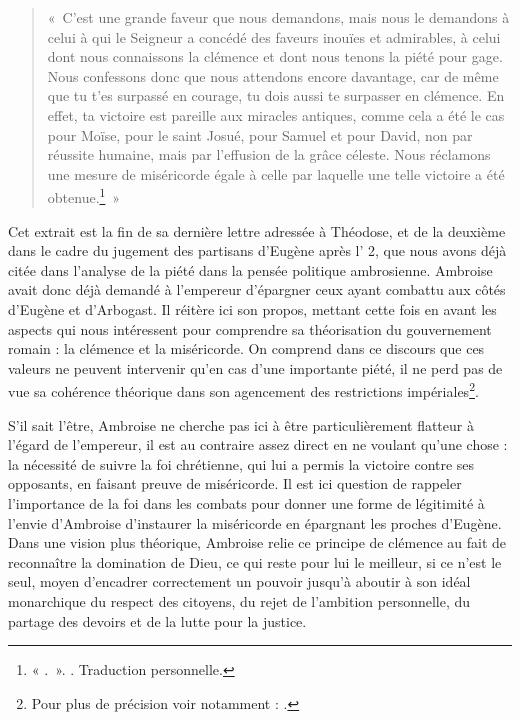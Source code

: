 \bigskip

\begin{quote}
    «~C'est une grande faveur que nous demandons, mais nous le demandons à celui à qui le Seigneur a concédé des faveurs inouïes et admirables, à celui dont nous connaissons la clémence et dont nous tenons la piété pour gage. Nous confessons donc que nous attendons encore davantage, car de même que tu t'es surpassé en courage, tu dois aussi te surpasser en clémence. En effet, ta victoire est pareille aux miracles antiques, comme cela a été le cas pour Moïse, pour le saint Josué, pour Samuel et pour David, non par réussite humaine, mais par l’effusion de la grâce céleste. Nous réclamons une mesure de miséricorde égale à celle par laquelle une telle victoire a été obtenue.\footnote{« .~». \cite[\nopp ec. 3, 4]{ambroise_csel_82_3}. Traduction personnelle.}~»
\end{quote}

\bigskip

Cet extrait est la fin de sa dernière lettre adressée à Théodose, et de la deuxième dans le cadre du jugement des partisans d'Eugène après l' 2, que nous avons déjà citée dans l'analyse de la piété dans la pensée politique ambrosienne. Ambroise avait donc déjà demandé à l'empereur d'épargner ceux ayant combattu aux côtés d'Eugène et d'Arbogast. Il réitère ici son propos, mettant cette fois en avant les aspects qui nous intéressent pour comprendre sa théorisation du gouvernement romain : la clémence et la miséricorde. On comprend dans ce discours que ces valeurs ne peuvent intervenir qu'en cas d'une importante piété, il ne perd pas de vue sa cohérence théorique dans son agencement des restrictions impériales\footnote{Pour plus de précision voir notamment : \cite[351-353]{mclynn_ambrose}.}.

\bigskip

S’il sait l’être, Ambroise ne cherche pas ici à être particulièrement flatteur à l’égard de l’empereur, il est au contraire assez direct en ne voulant qu’une chose : la nécessité de suivre la foi chrétienne, qui lui a permis la victoire contre ses opposants, en faisant preuve de miséricorde. Il est ici question de rappeler l’importance de la foi dans les combats pour donner une forme de légitimité à l’envie d’Ambroise d’instaurer la miséricorde en épargnant les proches d'Eugène. Dans une vision plus théorique, Ambroise relie ce principe de clémence au fait de reconnaître la domination de Dieu, ce qui reste pour lui le meilleur, si ce n’est le seul, moyen d'encadrer correctement un pouvoir jusqu’à aboutir à son idéal monarchique du respect des citoyens, du rejet de l’ambition personnelle, du partage des devoirs et de la lutte pour la justice.


